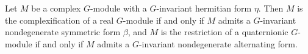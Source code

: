 Let $M$ be a complex $G$-module with a $G$-invariant hermitian form $\eta$. Then $M$ is the complexification of a real $G$-module if and only if $M$ admits a $G$-invariant nondegenerate symmetric form $\beta$, and $M$ is the restriction of a quaternionic $G$-module if and only if $M$ admits a $G$-invariant nondegenerate alternating form.
